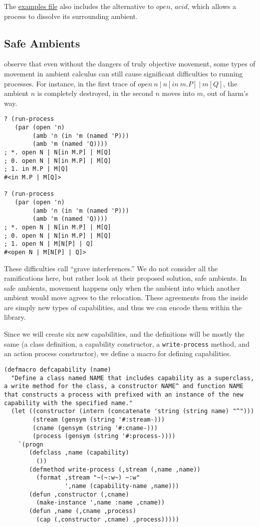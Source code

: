 \documentclass[12pt]{article}
\begin{document}
The \href{%
  http://svn.cs.rpi.edu/svn/tayloj/mobile-ambients/examples.lisp}{%
  examples file} also includes the alternative to $\mathit{open}$, $\mathit{acid}$, which allows a process to dissolve its surrounding ambient.

\subsection{Safe Ambients}
\label{sec:safe-ambients}

 observe that even without the dangers of truly objective movement, some types of movement in  ambient calculus can still cause significant difficulties to running processes.
For instance, in the first trace of $\mathit{open}\ n\ |\ n[\mathit{in}\ m.P]\ |\ m[Q]$, the ambient $n$ is completely destroyed, in the second $n$ moves into $m$, out of harm's way.

\begin{verbatim}
? (run-process 
   (par (open 'n)
        (amb 'n (in 'm (named 'P)))
        (amb 'm (named 'Q))))
; *. open N | N[in M.P] | M[Q]
; 0. open N | N[in M.P] | M[Q]
; 1. in M.P | M[Q]
#<in M.P | M[Q]>

? (run-process 
   (par (open 'n)
        (amb 'n (in 'm (named 'P)))
        (amb 'm (named 'Q))))
; *. open N | N[in M.P] | M[Q]
; 0. open N | N[in M.P] | M[Q]
; 1. open N | M[N[P] | Q]
#<open N | M[N[P] | Q]>
\end{verbatim}

These difficulties  call ``grave interferences.''
We do not consider all the ramifications here, but rather look at their proposed solution, safe ambients.
In safe ambients, movement happens only when the ambient into which another ambient would move agrees to the relocation.
These agreements from the inside are simply new types of capabilities, and thus we can encode them within the library.

Since we will create six new capabilities, and the definitions will be mostly the same (a class definition, a capability constructor, a \texttt{write-process} method, and an action process constructor), we define a macro for defining capabilities.

\begin{verbatim}
(defmacro defcapability (name)
  "Define a class named NAME that includes capability as a superclass,
a write method for the class, a constructor NAME^ and function NAME
that constructs a process with prefixed with an instance of the new
capability with the specified name."
  (let ((constructor (intern (concatenate 'string (string name) "^")))
        (stream (gensym (string '#:stream-)))
        (cname (gensym (string '#:cname-)))
        (process (gensym (string '#:process-))))
    `(progn
       (defclass ,name (capability)
         ())
       (defmethod write-process (,stream (,name ,name))
         (format ,stream "~(~:w~) ~:w"
                 ',name (capability-name ,name)))
       (defun ,constructor (,cname)
         (make-instance ',name :name ,cname))
       (defun ,name (,cname ,process)
         (cap (,constructor ,cname) ,process)))))
\end{verbatim}
\end{document}
